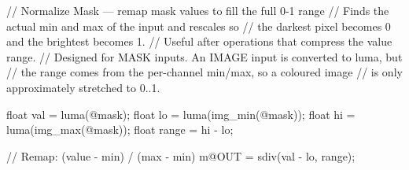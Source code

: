 // Normalize Mask — remap mask values to fill the full 0-1 range
// Finds the actual min and max of the input and rescales so
// the darkest pixel becomes 0 and the brightest becomes 1.
// Useful after operations that compress the value range.
// Designed for MASK inputs. An IMAGE input is converted to luma, but
// the range comes from the per-channel min/max, so a coloured image
// is only approximately stretched to 0..1.

float val = luma(@mask);
float lo = luma(img_min(@mask));
float hi = luma(img_max(@mask));
float range = hi - lo;

// Remap: (value - min) / (max - min)
m@OUT = sdiv(val - lo, range);
